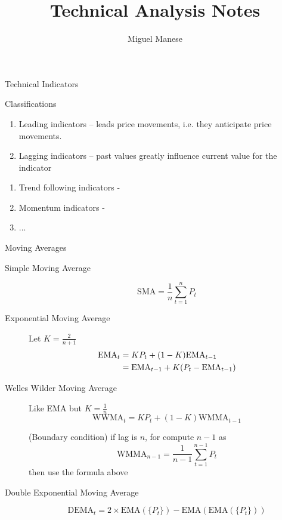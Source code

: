 \documentclass{article}
\title{Technical Analysis Notes}
\author{Miguel Manese}
\date{}
\begin{document}
\maketitle

\begin{section}{Technical Indicators}
\begin{subsection}{Classifications}

\begin{enumerate}
\item Leading indicators -- leads price movements, i.e. they anticipate price movements.
\item Lagging indicators -- past values greatly influence current value for the indicator
\end{enumerate}

\begin{enumerate}
\item Trend following indicators - 
\item Momentum indicators - 
\item ...
\end{enumerate}

\end{subsection}

\begin{subsection}{Moving Averages}
\begin{description}

\item[Simple Moving Average]  
 \[ \text{SMA} = \frac{1}{n} \sum_{t=1}^n P_t \]

\item[Exponential Moving Average] Let $K = \frac{2}{n+1}$
 \begin{align}
 \text{EMA}_t &= K P_t + (1 - K) \text{EMA}_{t-1} \notag\\
              &= \text{EMA}_{t-1} + K (P_t - \text{EMA}_{t-1}) \notag
 \end{align}

\item[Welles Wilder Moving Average] Like EMA but $K = \frac{1}{n}$
 \[ \text{WWMA}_t = K P_t + (1 - K) \text{WMMA}_{t-1} \]

 (Boundary condition) if lag is $n$, for compute $n-1$ as
 \[ \text{WMMA}_{n-1} = \frac{1}{n-1} \sum_{t=1}^{n-1} P_t \]
 then use the formula above

\item[Double Exponential Moving Average]
 \[ \text{DEMA}_t = 2 \times \text{EMA}(\{P_t\}) - 
         \text{EMA}(\text{EMA}(\{P_t\})) \]


\end{description}
\end{subsection}
\end{section}
\end{document}
